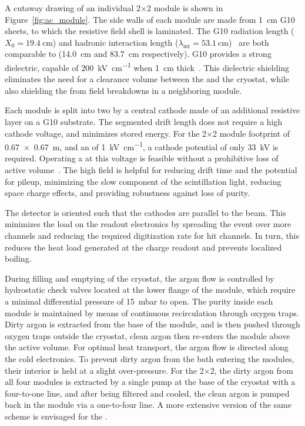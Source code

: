A cutaway drawing of an individual 2$\times$2 module is shown in Figure~\ref{fig:ac_module}. The side walls of each module are made from \SI{1}{\centi\metre} G10 sheets, to which the resistive field shell is laminated. The G10 radiation length ($X_{\mathrm{0}} = \SI{19.4}{\centi\metre}$) and hadronic interaction length ($\lambda_{\mathrm{int}} = \SI{53.1}{\centi\metre}$)~\cite{Tanabashi:2018oca} %
are both comparable to  (14.0~cm and 83.7~cm respectively). 
G10 provides a strong dielectric, capable of \SI{200}{\kilo\volt\per\centi\metre} when \SI{1}{\centi\metre} thick~\cite{G10Breakdown}. This dielectric shielding eliminates the need for a clearance volume between the  and the cryostat, while also shielding the  from field breakdowns in a neighboring module. 

Each module is split into two  by a central cathode made of an additional resistive layer on a G10 substrate. The segmented drift length does not require a high cathode voltage, and minimizes stored energy. For the 2$\times$2 module footprint of \SI{0.67 x 0.67}{\metre}, and an \efield of \SI{1}{\kilo\volt\per\centi\metre}, a cathode potential of only \SI{33}{\kilo\volt} is required. Operating a  at this voltage is feasible without a prohibitive loss of active volume~\cite{Zeller:2013sva}.  The high field is helpful for reducing drift time and the potential for pileup, minimizing the slow component of the scintillation light, reducing space charge effects, and providing robustness against loss of  purity.  

The detector is oriented such that the cathodes are parallel to the beam. This minimizes the load on the readout electronics by spreading the event over more channels and reducing the required digitization rate for hit channels. In turn, this reduces the heat load generated at the charge readout and prevents localized boiling.

During filling and emptying of the cryostat, the argon flow is controlled by hydrostatic check valves located at the lower flange of the module, which require a minimal differential pressure of \SI{15}{\milli\bar} to open. The purity inside each module is maintained by means of continuous  recirculation through oxygen traps. Dirty argon is extracted from the base of the module, and is then pushed through oxygen traps outside the cryostat, clean argon then re-enters the module above the active volume. For optimal heat transport, the argon flow is directed along the cold electronics. To prevent dirty argon from the bath entering the modules, their interior is held at a slight over-pressure. For the 2$\times$2, the dirty argon from all four modules is extracted by a single pump at the base of the cryostat with a four-to-one line, and after being filtered and cooled, the clean argon is pumped back in the module via a one-to-four line.
A more extensive version of the same scheme is envisaged for the  .  


